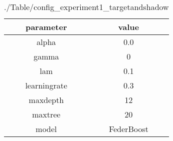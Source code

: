 \begin{table}[h]
\centering
\begin{tabular}{| c|c|}
\hline
parameter & value\\
\hline
alpha & 0.0 \\\hline
gamma & 0 \\\hline
lam & 0.1 \\\hline
learningrate & 0.3 \\\hline
maxdepth & 12 \\\hline
maxtree & 20 \\\hline
model & FederBoost \\\hline

\end{tabular}\caption{./Table/config_experiment1_targetandshadow}
\label{tab:./Table/config_experiment1_targetandshadow}
\end{table}
